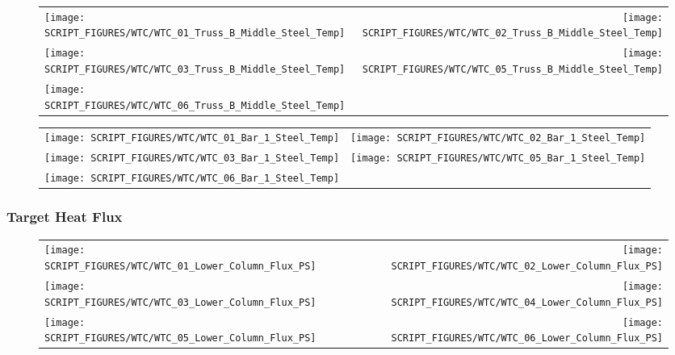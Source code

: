 \begin{figure}[p]
\begin{tabular*}{\textwidth}{l@{\extracolsep{\fill}}r}
\texttt{[image: SCRIPT\_FIGURES/WTC/WTC\_01\_Truss\_B\_Middle\_Steel\_Temp]} &
\texttt{[image: SCRIPT\_FIGURES/WTC/WTC\_02\_Truss\_B\_Middle\_Steel\_Temp]} \\
\texttt{[image: SCRIPT\_FIGURES/WTC/WTC\_03\_Truss\_B\_Middle\_Steel\_Temp]} &
\texttt{[image: SCRIPT\_FIGURES/WTC/WTC\_05\_Truss\_B\_Middle\_Steel\_Temp]} \\
\texttt{[image: SCRIPT\_FIGURES/WTC/WTC\_06\_Truss\_B\_Middle\_Steel\_Temp]}
\end{tabular*}
\end{figure}

\begin{figure}[p]
\begin{tabular*}{\textwidth}{l@{\extracolsep{\fill}}r}
\texttt{[image: SCRIPT\_FIGURES/WTC/WTC\_01\_Bar\_1\_Steel\_Temp]} &
\texttt{[image: SCRIPT\_FIGURES/WTC/WTC\_02\_Bar\_1\_Steel\_Temp]} \\
\texttt{[image: SCRIPT\_FIGURES/WTC/WTC\_03\_Bar\_1\_Steel\_Temp]} &
\texttt{[image: SCRIPT\_FIGURES/WTC/WTC\_05\_Bar\_1\_Steel\_Temp]} \\
\texttt{[image: SCRIPT\_FIGURES/WTC/WTC\_06\_Bar\_1\_Steel\_Temp]}
\end{tabular*}
\end{figure}

\clearpage

\subsubsection{Target Heat Flux}

\begin{figure}[p]
\begin{tabular*}{\textwidth}{l@{\extracolsep{\fill}}r}
\texttt{[image: SCRIPT\_FIGURES/WTC/WTC\_01\_Lower\_Column\_Flux\_PS]} &
\texttt{[image: SCRIPT\_FIGURES/WTC/WTC\_02\_Lower\_Column\_Flux\_PS]} \\
\texttt{[image: SCRIPT\_FIGURES/WTC/WTC\_03\_Lower\_Column\_Flux\_PS]} &
\texttt{[image: SCRIPT\_FIGURES/WTC/WTC\_04\_Lower\_Column\_Flux\_PS]} \\
\texttt{[image: SCRIPT\_FIGURES/WTC/WTC\_05\_Lower\_Column\_Flux\_PS]} &
\texttt{[image: SCRIPT\_FIGURES/WTC/WTC\_06\_Lower\_Column\_Flux\_PS]}
\end{tabular*}
\end{figure}

